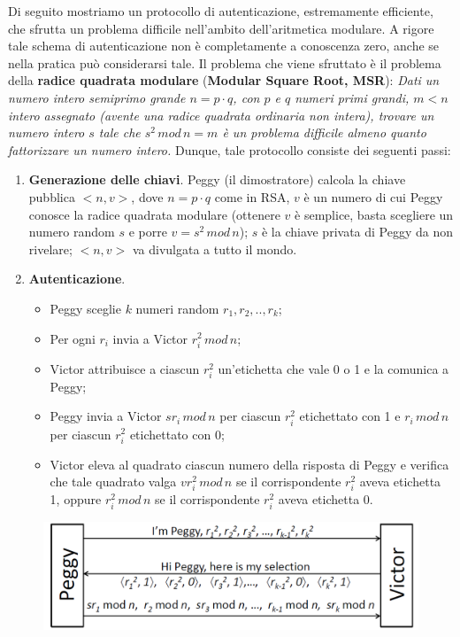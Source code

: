 Di seguito mostriamo un protocollo di autenticazione, estremamente efficiente, che sfrutta un problema difficile nell'ambito dell'aritmetica modulare. A rigore tale schema di autenticazione non è completamente a conoscenza zero, anche se nella pratica può considerarsi tale. 
\newline \newline
Il problema che viene sfruttato è il problema della \textbf{radice quadrata modulare} (\textbf{Modular Square Root, MSR}): 
\newline \newline
\textit{Dati un numero intero semiprimo grande $n=p \cdot q$, con $p$ e $q$ numeri primi grandi, $m<n$ intero assegnato (avente una radice quadrata ordinaria non intera), trovare un numero intero $s$ tale che $s^2 \, mod \, n=m$ è un problema difficile almeno quanto fattorizzare un numero intero. }
\newline \newline
Dunque, tale protocollo consiste dei seguenti passi: 
\begin{enumerate}
\item \textbf{Generazione delle chiavi}. Peggy (il dimostratore) calcola la chiave pubblica $<n,v>$, dove $n=p \cdot q$ come in RSA, $v$ è un numero di cui Peggy conosce la radice quadrata modulare (ottenere $v$ è semplice, basta scegliere un numero random $s$ e porre $v = s^2 \, mod \, n$); $s$ è la chiave privata di Peggy da non rivelare; $<n,v>$ va divulgata a tutto il mondo.
\item \textbf{Autenticazione}. \begin{itemize}
\item Peggy sceglie $k$ numeri random $r_{1},r_{2},..,r_{k}$;
\item Per ogni $r_{i}$ invia a Victor $r_{i}^2 \, mod \, n$;
\item Victor attribuisce a ciascun $r_{i}^2$ un'etichetta che vale 0 o 1 e la comunica a Peggy;
\item Peggy invia a Victor $sr_{i} \, mod \, n$ per ciascun $r_{i}^2$ etichettato con 1 e $r_{i} \, mod \, n$ per ciascun $r_{i}^2$ etichettato con 0;
\item Victor eleva al quadrato ciascun numero della risposta di Peggy e verifica che tale quadrato valga $vr_{i}^2 \, mod \, n$ se il corrispondente $r_{i}^2$ aveva etichetta 1, oppure $r_{i}^2 \, mod \, n$ se il corrispondente $r_{i}^2$ aveva etichetta 0.
\end{itemize}
\end{enumerate}
\begin{figure}[htbp]
	\centering%
	\subfigure%
	{\includegraphics[scale=0.6, keepaspectratio]{Immagini/chiave_pubblica/zkasmsr_auth.png}}
	\caption{}
\end{figure}
